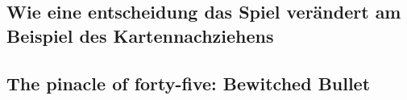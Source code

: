 
%


\subsection{Wie eine entscheidung das Spiel verändert am Beispiel des Kartennachziehens}\label{subsec:placementMatters}




\subsection{The pinacle of forty-five: Bewitched Bullet}\label{subsec:placementMatters}


\renewcommand{\kapitelautor}{}
